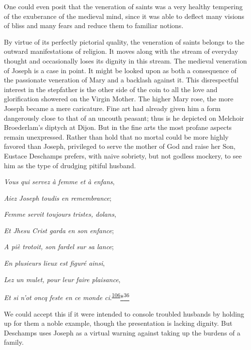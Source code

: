 One could even posit that the veneration of saints was a very healthy
tempering of the exuberance of the medieval mind, since it was able to
deflect many visions of bliss and many fears and reduce them to familiar
notions.

By virtue of its perfectly pictorial quality, the veneration of saints
belongs to the outward manifestations of religion. It moves along with
the stream of everyday thought and occasionally loses its dignity in
this stream. The medieval veneration of Joseph is a case in point. It
might be looked upon as both a consequence of the
pas\protect\hypertarget{13_Chapter_Six__THE_DEPICTION_OF_TH.xhtmlux5cux23page_194}{}{}sionate
veneration of Mary and a backlash against it. This disrespectful
interest in the stepfather is the other side of the coin to all the love
and glorification showered on the Virgin Mother. The higher Mary rose,
the more Joseph became a mere caricature. Fine art had already given him
a form dangerously close to that of an uncouth peasant; thus is he
depicted on Melchoir Broederlam's diptych at Dijon. But in the fine arts
the most profane aspects remain unexpressed. Rather than hold that no
mortal could be more highly favored than Joseph, privileged to serve the
mother of God and raise her Son, Eustace Deschamps prefers, with naive
sobriety, but not godless mockery, to see him as the type of drudging
pitiful husband.

\emph{Vous qui servez à femme et à enfans},

\emph{Aiez Joseph toudis en remembrance};

\emph{Femme servit toujours tristes, dolans},

\emph{Et Jhesu Crist garda en son enfance};

\emph{A piè trotoit, son fardel sur sa lance};

\emph{En plusieurs lieux est figuré ainsi},

\emph{Lez un mulet, pour leur faire plaisance},

\emph{Et si n'ot oncq feste en ce monde
ci}.\textsuperscript{\protect\hypertarget{13_Chapter_Six__THE_DEPICTION_OF_TH.xhtmlux5cux23id_1060}{\protect\hyperlink{23_NOTES.xhtmlux5cux23id_1061}{106}}}\protect\hypertarget{13_Chapter_Six__THE_DEPICTION_OF_TH.xhtmlux5cux23id_3059}{\protect\hyperlink{23_NOTES.xhtmlux5cux23id_3060}{*\textsuperscript{36}}}

We could accept this if it were intended to console troubled husbands by
holding up for them a noble example, though the presentation is lacking
dignity. But Deschamps uses Joseph as a virtual warning against taking
up the burdens of a family.

